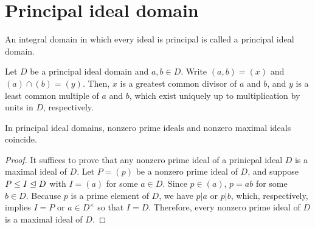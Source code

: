 \section{Principal ideal domain}

\begin{defi}
    An integral domain in which every ideal is principal is called a principal ideal domain.
\end{defi}

\begin{rmk}
    Let $D$ be a principal ideal domain and $a, b\in D$.
    Write $(a, b)=(x)$ and $(a)\cap(b)=(y)$.
    Then, $x$ is a greatest common divisor of $a$ and $b$, and $y$ is a least common multiple of $a$ and $b$, which exist uniquely up to multiplication by units in $D$, respectively.
\end{rmk}

\begin{thm}
    In principal ideal domains, nonzero prime ideals and nonzero maximal ideals coincide.
\end{thm}
\begin{proof}
    It suffices to prove that any nonzero prime ideal of a prinicpal ideal $D$ is a maximal ideal of $D$.
    Let $P=(p)$ be a nonzero prime ideal of $D$, and suppose $P\leq I\trianglelefteq D$ with $I=(a)$ for some $a\in D$.
    Since $p\in (a)$, $p=ab$ for some $b\in D$.
    Because $p$ is a prime element of $D$, we have $p|a$ or $p|b$, which, respectively, implies $I=P$ or $a\in D^\times$ so that $I=D$.
    Therefore, every nonzero prime ideal of $D$ is a maximal ideal of $D$.
\end{proof}

